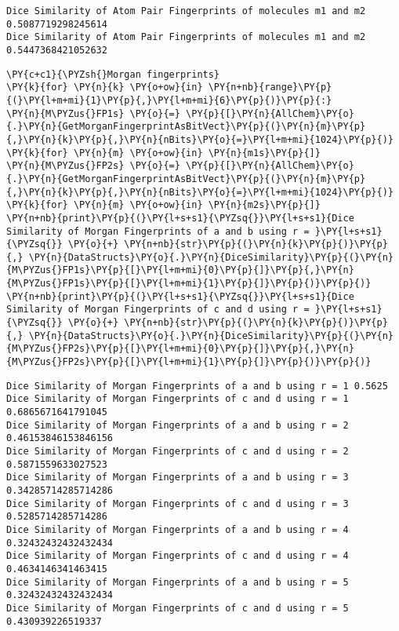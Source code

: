 \begin{Verbatim}[commandchars=\\\{\}]
Dice Similarity of Atom Pair Fingerprints of molecules m1 and m2
0.5087719298245614
Dice Similarity of Atom Pair Fingerprints of molecules m1 and m2
0.5447368421052632
\end{Verbatim}

\begin{tcolorbox}[breakable, size=fbox, boxrule=1pt, pad at break*=1mm,colback=cellbackground, colframe=cellborder]
\begin{Verbatim}[commandchars=\\\{\}]
\PY{c+c1}{\PYZsh{}Morgan fingerprints}
\PY{k}{for} \PY{n}{k} \PY{o+ow}{in} \PY{n+nb}{range}\PY{p}{(}\PY{l+m+mi}{1}\PY{p}{,}\PY{l+m+mi}{6}\PY{p}{)}\PY{p}{:}
\PY{n}{M\PYZus{}FP1s} \PY{o}{=} \PY{p}{[}\PY{n}{AllChem}\PY{o}{.}\PY{n}{GetMorganFingerprintAsBitVect}\PY{p}{(}\PY{n}{m}\PY{p}{,}\PY{n}{k}\PY{p}{,}\PY{n}{nBits}\PY{o}{=}\PY{l+m+mi}{1024}\PY{p}{)} \PY{k}{for} \PY{n}{m} \PY{o+ow}{in} \PY{n}{m1s}\PY{p}{]}
\PY{n}{M\PYZus{}FP2s} \PY{o}{=} \PY{p}{[}\PY{n}{AllChem}\PY{o}{.}\PY{n}{GetMorganFingerprintAsBitVect}\PY{p}{(}\PY{n}{m}\PY{p}{,}\PY{n}{k}\PY{p}{,}\PY{n}{nBits}\PY{o}{=}\PY{l+m+mi}{1024}\PY{p}{)} \PY{k}{for} \PY{n}{m} \PY{o+ow}{in} \PY{n}{m2s}\PY{p}{]}
\PY{n+nb}{print}\PY{p}{(}\PY{l+s+s1}{\PYZsq{}}\PY{l+s+s1}{Dice Similarity of Morgan Fingerprints of a and b using r = }\PY{l+s+s1}{\PYZsq{}} \PY{o}{+} \PY{n+nb}{str}\PY{p}{(}\PY{n}{k}\PY{p}{)}\PY{p}{,} \PY{n}{DataStructs}\PY{o}{.}\PY{n}{DiceSimilarity}\PY{p}{(}\PY{n}{M\PYZus{}FP1s}\PY{p}{[}\PY{l+m+mi}{0}\PY{p}{]}\PY{p}{,}\PY{n}{M\PYZus{}FP1s}\PY{p}{[}\PY{l+m+mi}{1}\PY{p}{]}\PY{p}{)}\PY{p}{)}
\PY{n+nb}{print}\PY{p}{(}\PY{l+s+s1}{\PYZsq{}}\PY{l+s+s1}{Dice Similarity of Morgan Fingerprints of c and d using r = }\PY{l+s+s1}{\PYZsq{}} \PY{o}{+} \PY{n+nb}{str}\PY{p}{(}\PY{n}{k}\PY{p}{)}\PY{p}{,} \PY{n}{DataStructs}\PY{o}{.}\PY{n}{DiceSimilarity}\PY{p}{(}\PY{n}{M\PYZus{}FP2s}\PY{p}{[}\PY{l+m+mi}{0}\PY{p}{]}\PY{p}{,}\PY{n}{M\PYZus{}FP2s}\PY{p}{[}\PY{l+m+mi}{1}\PY{p}{]}\PY{p}{)}\PY{p}{)}

\end{Verbatim}
\end{tcolorbox}

\begin{Verbatim}[commandchars=\\\{\}]
Dice Similarity of Morgan Fingerprints of a and b using r = 1 0.5625
Dice Similarity of Morgan Fingerprints of c and d using r = 1 0.6865671641791045
Dice Similarity of Morgan Fingerprints of a and b using r = 2
0.46153846153846156
Dice Similarity of Morgan Fingerprints of c and d using r = 2 0.5871559633027523
Dice Similarity of Morgan Fingerprints of a and b using r = 3
0.34285714285714286
Dice Similarity of Morgan Fingerprints of c and d using r = 3 0.5285714285714286
Dice Similarity of Morgan Fingerprints of a and b using r = 4
0.32432432432432434
Dice Similarity of Morgan Fingerprints of c and d using r = 4 0.4634146341463415
Dice Similarity of Morgan Fingerprints of a and b using r = 5
0.32432432432432434
Dice Similarity of Morgan Fingerprints of c and d using r = 5 0.430939226519337
\end{Verbatim}


